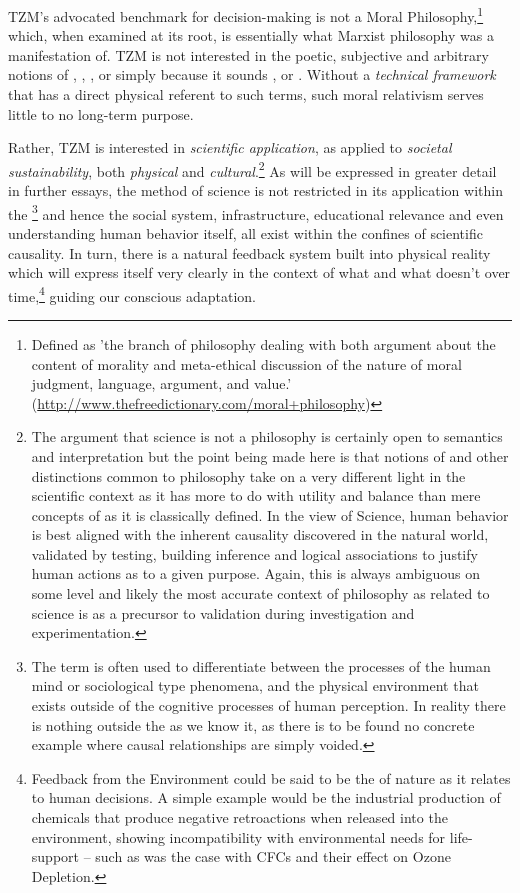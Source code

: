 \documentclass[10pt, a4paper, cleardoubleempty, openright, twoside]{book}
\begin{document}
TZM's advocated benchmark for decision-making is not a Moral
Philosophy,\footnote{
	Defined as 'the branch of philosophy dealing with both argument about
	the content of morality and meta-ethical discussion of the nature of
	moral judgment, language, argument, and value.'
	(\url{http://www.thefreedictionary.com/moral+philosophy})
} 
which, when examined at its root, is essentially what Marxist philosophy
was a manifestation of. TZM is not interested in the poetic, subjective
and arbitrary notions of ,
, , or
 simply because it sounds
,  or . Without a
\emph{technical framework} that has a direct physical referent to such
terms, such moral relativism serves little to no long-term purpose.

Rather, TZM is interested in \emph{scientific application}, as applied
to \emph{societal sustainability}, both \emph{physical} and
\emph{cultural}.\footnote{
	The argument that science is not a philosophy is certainly open to
	semantics and interpretation but the point being made here is that
	notions of  and other 
	distinctions common to philosophy take on a very different light in
	the scientific context as it has more to do with utility and balance
	than mere concepts of  as it is classically
	defined. In the view of Science, human behavior is best aligned with
	the inherent causality discovered in the natural world, validated by
	testing, building inference and logical associations to justify human
	actions as  to a given purpose. Again, this is
	always ambiguous on some level and likely the most accurate context of
	philosophy as related to science is as a precursor to validation
	during investigation and experimentation.
} 
As will be expressed in greater detail in further essays, the method of
science is not restricted in its application within the
\footnote{
	The term  is often used to differentiate
	between the  processes of the human mind or
	sociological type phenomena, and the physical environment that exists
	outside of the cognitive processes of human perception. In reality
	there is nothing outside the  as we know it,
	as there is to be found no concrete example where causal relationships
	are simply voided.
} 
and hence the social system, infrastructure, educational relevance and
even understanding human behavior itself, all exist within the confines
of scientific causality. In turn, there is a natural feedback system
built into physical reality which will express itself very clearly in
the context of what  and what doesn't over
time,\footnote{
	Feedback from the Environment could be said to be the
	 of nature as it relates to human
	decisions. A simple example would be the industrial production of
	chemicals that produce negative retroactions when released into the
	environment, showing incompatibility with environmental needs for
	life-support -- such as was the case with CFCs and their effect on
	Ozone Depletion.
} 
guiding our conscious adaptation.
\end{document}
